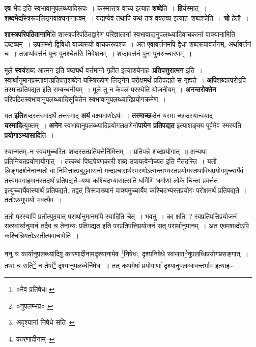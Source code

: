 \documentclass[article,12pt,a4paper]{memoir}
\begin{document}
	  \pstart \textbf{एष भे}\leavevmode{}द इति स्वभावानुपलब्ध्यादिरूपः । कस्मात्तत्र वाच्य इत्याह \textbf{शब्दे}ति । \textbf{हि}र्यस्मात् । \textbf{शब्दभेद}स्त्रिरूपलिङ्गवाक्यनानात्वम् । यद्यप्येवं तथापि कथं तत्र वक्तव्य इत्याह--शब्दश्चेति । \textbf{चो} हेतौ ।
	\pend
      

	  \pstart \textbf{शास्त्रपरिपठितानामि}ति शास्त्रपरिपठितद्वारेण परिज्ञातानां स्वभावाद्यनुपलब्ध्यादिवाचकानां वाक्यानामिति द्रष्टव्यम् । उपलम्भो द्विविधो वाच्यरूपो वाचकरूपश्च । अत एवावर्त्तनमपि द्वेधा शब्दरूपावर्त्तनम्, अर्थावर्त्तनं च । तत्रार्थावर्त्तनं पुनः पुनश्चेतसि निवेशनम् । शब्दावर्त्तनं पुनः पुनरुच्चारणम् ।
	\pend
      

	  \pstart मूले \textbf{स्वयं}शब्द आत्मन इति षष्ठ्यर्थे वर्त्तमानो गृहीत इत्याशयेनाह--\textbf{प्रतिपत्तुरात्मन} इति । स्वार्थानुमानप्रस्तावात्प्रतिपत्तृशब्देन यस्त्रिरूपेण लिङ्गेन परोक्षमर्थं प्रतिपद्यते स गृह्यते । \textbf{अपि}शब्दात्परोऽपि तस्मात्प्रतिपद्यत इति सम्बन्धनीयम् । मूले तु न केवलं परस्येति योजनीयम् । \textbf{अनन्तरोक्तेन} परिपठितस्वभावानुपलब्ध्यादिसूचितेन स्वभावानुपलब्ध्यादिप्रयोगक्रमेण ।
	\pend
      

	  \pstart यत \textbf{इति}शब्दस्तस्मादर्थे तत्तस्माद् \textbf{अयं} वक्ष्यमाणोऽर्थः । \textbf{तस्माच्छ}ब्देन यस्मा च्छब्दस्यान्वयाद् \textbf{यस्मादि}त्युक्तम् । \textbf{अनेन} स्वभावानुपलब्ध्यादिप्रयोगलक्षणेनो\textbf{पायेन प्रतिपद्यत} इत्याशङ्क्य पूर्वमेव स्मरयति \textbf{प्रयोगाऽभ्यासादि}ति ।
	\pend
      

	  \pstart स्यान्मतम्--न स्वयमुच्चरितः शब्दस्तत्प्रतिपत्तेर्निमित्तम् । प्रतिपन्ने शब्दप्रयोगात् ॥ अन्यथा प्रतिनियतप्रयोगायोगात् । तत्कथं पिष्टपेषणकारी शब्द उपायत्वेनोच्यत इति नैतदस्ति । यतो लिङ्गदर्शनेनान्यतो वा निमित्तात्प्रबुद्धवासनो मन्दप्रचारार्थस्मरणोऽत्यन्ताभ्यस्तप्रयोगस्तथाविधप्रयोगमुच्चार्यैवं तत्त्वमवगाहमानस्तदर्थं प्रतिपद्यते--यथा कश्चिदभ्यासात्सति धर्मिणि धर्माणां लोके चिन्ता प्रवर्त्तत इत्युच्चार्यैवास्यार्थं प्रतिपद्यते, तद्वत् त्रिरूपाख्यानं वाक्यमुच्चार्यैव कश्चिदभ्यस्तप्रयोगः परोक्षमर्थं प्रतिपद्यते । ततोऽयमुपायो भवत्येव ।
	\pend
      

	  \pstart ततो परस्यापि प्रतीत्युदयात् परार्थानुमानमपि स्यादिति चेत् । भवतु । का क्षतिः ? स्वप्रतिपत्तिप्रयोजनं सत्स्वार्थानुमानं तदैव च तेनान्यः प्रतिपद्यत इति परप्रतिपत्तिप्रयोजनं सत् परार्थानुमानम् । अत एवमशब्दोऽपि कश्चिन्नियतोऽस्तीत्यवाचामेति ।
	\pend
      \leavevmode{}
	  \bigskip
	  \begingroup
	

	  \pstart ननु च कार्यानुपलब्ध्यादिषु कारणादीनामदृश्यानामेव \footnote{०मेव प्रतिषेधः \cite{dp-msA} \cite{dp-edP} \cite{dp-edH} \cite{dp-edE} \cite{dp-edN}}निषेधः, दृश्यनिषेधे स्वभावा\footnote{०नुपलम्भप्र० \cite{dp-msA} \cite{dp-msB} \cite{dp-edP} \cite{dp-edH} \cite{dp-edE} \cite{dp-edN}}नुपलब्धिप्रयोगप्रसङ्गात् । तथा च सति\footnote{अदृश्यानां निषेधे सति--\cite{dp-msD-n}} न तेषां\footnote{कारणादीनाम्--\cite{dp-msD-n}} दृश्यानुपलब्धेर्निषेधः । तत् कथमेषां प्रयोगाणां दृश्यानुपलब्धावन्तर्भाव इत्याह--
	\pend
       
\end{document}
